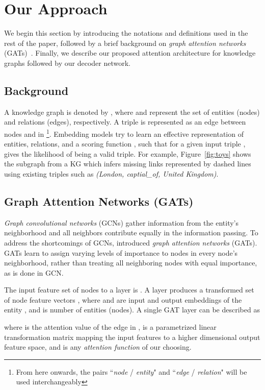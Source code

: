 \documentclass[11pt,a4paper]{article}
\begin{document}
\section{Our Approach}\label{our_approach}
We begin this section by introducing the notations and definitions used in the rest of the paper, 
followed by a brief background on \emph{graph attention networks} (GATs)~\cite{velickovic2018graph}. Finally, we describe our proposed attention architecture for knowledge graphs followed by our decoder network. 

\subsection{Background}
\label{ssec:background}
A knowledge graph is denoted by , where  and  represent the set of entities (nodes) and relations (edges), respectively. A triple  is represented as an edge  between nodes  and  in \footnote{From here onwards, the pairs ``\emph{node} / \emph{entity}" and ``\emph{edge} / \emph{relation}" will be used interchangeably}.
Embedding models try to learn an effective representation of entities, relations, and a scoring function , such that for a given input triple ,  gives the likelihood of  being a valid triple. For example, 
Figure~\ref{fig:toys} shows the subgraph from a KG which infers missing links represented by dashed lines using existing triples such as \textit{(London, captial\_of, United Kingdom)}.

\subsection{Graph Attention Networks (GATs)}
\label{ssec:background}
\emph{Graph convolutional networks} (GCNs) \cite{kipf2017semi} gather information from the entity's neighborhood and all  neighbors contribute equally in the information passing.
To address the shortcomings of GCNs, \cite{velickovic2018graph} introduced \emph{graph attention networks} (GATs). GATs learn to assign varying levels of importance to nodes in every node's neighborhood, rather than treating all neighboring nodes with equal importance, as is done in GCN. 

The input feature set of nodes to a layer is . A layer produces a transformed set of node feature vectors , where  and  are input and output embeddings of the entity , and  is number of entities (nodes). A single GAT layer can be described as

where  is the attention value of the edge  in ,  is a parametrized linear transformation matrix mapping the input features to a higher dimensional output feature space, and  is any \emph{attention function} of our choosing.
\end{document}

